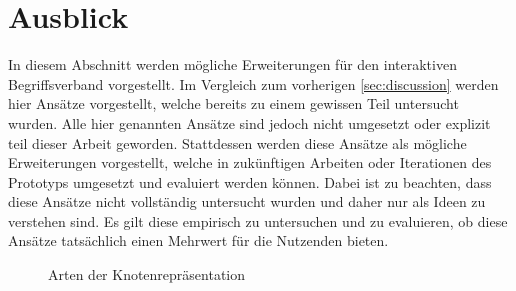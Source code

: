 \section{Ausblick}\label{sec:outlook}
In diesem Abschnitt werden mögliche Erweiterungen für den interaktiven Begriffsverband vorgestellt.
Im Vergleich zum vorherigen \autoref{sec:discussion} werden hier Ansätze vorgestellt, welche bereits zu einem gewissen Teil untersucht wurden.
Alle hier genannten Ansätze sind jedoch nicht umgesetzt oder explizit teil dieser Arbeit geworden.
Stattdessen werden diese Ansätze als mögliche Erweiterungen vorgestellt, welche in zukünftigen Arbeiten oder Iterationen des Prototyps umgesetzt und evaluiert werden können.
Dabei ist zu beachten, dass diese Ansätze nicht vollständig untersucht wurden und daher nur als Ideen zu verstehen sind.
Es gilt diese empirisch zu untersuchen und zu evaluieren, ob diese Ansätze tatsächlich einen Mehrwert für die Nutzenden bieten. \\

\begin{figure}[!ht]
    \centering
    \caption{\label{fig:node-types}Arten der Knotenrepräsentation}
\end{figure}

